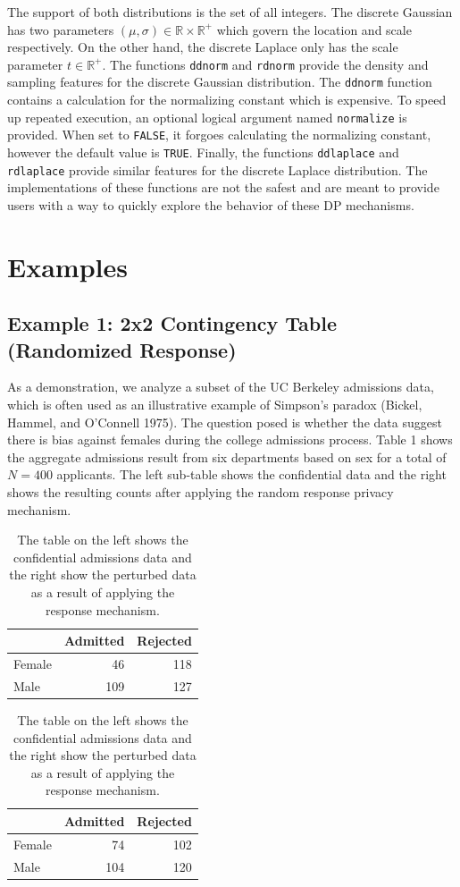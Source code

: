 The support of both distributions is the set of all integers. The discrete Gaussian has
two parameters \((\mu,\sigma) \in \mathbb{R} \times \mathbb{R}^+\) which govern the location and
scale respectively. On the other hand, the discrete Laplace only has the scale parameter \(t \in \mathbb{R}^+\). The functions \texttt{ddnorm} and \texttt{rdnorm} provide the
density and sampling features for the discrete Gaussian distribution. The \texttt{ddnorm}
function contains a calculation for the normalizing constant which is expensive. To
speed up repeated execution, an optional logical argument named \texttt{normalize} is provided. When set to \texttt{FALSE}, it forgoes calculating the normalizing constant, however the default value is
\texttt{TRUE}. Finally, the functions
\texttt{ddlaplace} and \texttt{rdlaplace} provide similar features for the discrete Laplace distribution.
The implementations of these functions are not the safest and are meant to provide
users with a way to quickly explore the behavior of these DP mechanisms.

\hypertarget{examples}{%
\section{Examples}\label{examples}}

\hypertarget{example-1-2x2-contingency-table-randomized-response}{%
\subsection{Example 1: 2x2 Contingency Table (Randomized Response)}\label{example-1-2x2-contingency-table-randomized-response}}

As a demonstration, we analyze a subset of the UC Berkeley admissions data, which is often
used as an illustrative example of Simpson's paradox (Bickel, Hammel, and O'Connell 1975). The question posed is whether
the data suggest there is bias against females during the college admissions
process. Table 1 shows the aggregate admissions result from six departments based on sex
for a total of \(N = 400\) applicants. The left sub-table shows the confidential data and the right shows the resulting counts after applying the random response privacy mechanism.

\begin{table}[!h]
\centering
\centering
\begin{tabular}[t]{lrr}
\toprule
  & Admitted & Rejected\\
\midrule
Female & 46 & 118\\
Male & 109 & 127\\
\bottomrule
\end{tabular}
\centering
\begin{tabular}[t]{lrr}
\toprule
  & Admitted & Rejected\\
\midrule
Female & 74 & 102\\
Male & 104 & 120\\
\bottomrule
\end{tabular}
\caption{The table on the left shows the confidential admissions data and the right show the perturbed data as a result of applying the response mechanism.}
\end{table}

